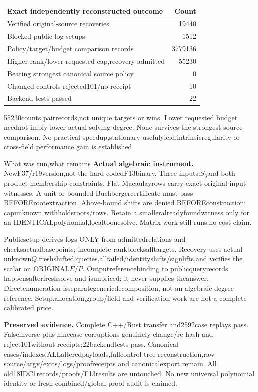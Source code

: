 \documentclass[11pt]{article}\usepackage[margin=.78in]{geometry}\usepackage{amsmath,amssymb,graphicx,booktabs,hyperref}\setlength{\parindent}{0pt}\setlength{\parskip}{6pt}
\begin{document}
\begin{center}\begin{tabular}{lr}\toprule
Exact independently reconstructed outcome & Count\\\midrule
Verified original-source recoveries &19440\\
Blocked public-log setups &1512\\
Policy/target/budget comparison records &3779136\\
Higher rank/lower requested cap,recovery admitted &55230\\
Beating strongest canonical source policy &0\\
Changed controls rejected101/no receipt &10\\
Backend tests passed &22\\\bottomrule\end{tabular}\end{center}
55230counts pairrecords,not unique targets or wins. Lower requested budget
neednot imply lower actual solving degree. None survives the strongest-source
comparison. No practical speedup,stationary usefulyield,intrinsicregularity or
cross-field performance gain is established.

\clearpage
{\Large What was run,what remains}
\textbf{Actual algebraic instrument.} NewF37/r19version,not the hard-codedF13binary.
Three inputs:$S_3$and both product-membership constraints. Flat Macaulayrows
carry exact original-input witnesses. A unit or bounded Buchbergercertificate
must pass BEFORErootextraction. Above-bound shifts are denied BEFOREconstruction;
capunknown withholdsroots/rows. Retain a smalleralreadyfoundwitness only for
an IDENTICALpolynomial,localtoonesolve. Matrix work still runs;no cost claim.

Publicsetup derives logs ONLY from admittedrelations and checksactualbasepoints;
incomplete rankblocksalltargets. Recovery uses actual unknown$Q$,freshshifted
queries,allfailed/identityshifts/signlifts,and verifies the scalar on ORIGINAL$E/P$.
Outputreferencebinding to publicqueryrecords happensafterfreshsolve and isunpriced;
it never supplies theanswer. Directenumeration isseparategenericdecomposition,
not an algebraic degree reference. Setup,allocation,group/field and verification
work are not a complete calibrated price.

\textbf{Preserved evidence.} Complete C++/Rust transfer and2592case replays pass.
Falseinverse plus ninecase corruptions genuinely change/re-hash and reject101without
receipts;22backendtests pass. Canonical cases/indexes,ALLalteredpayloads,fullcontrol
tree reconstruction,raw source/argv/exits/logs/proofreceipts and canonicalexport remain.
All old18IDC1records/proofs/F13results are untouched. No new universal polynomial
identity or fresh combined/global proof audit is claimed.
\end{document}
